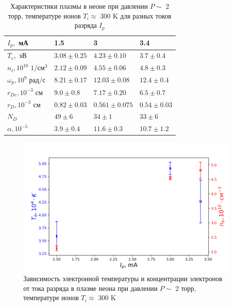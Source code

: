 \documentclass[a4paper,12pt]{article} %
\begin{document}
\begin{table}[h!]
\caption{Характеристики плазмы в неоне при давлении $P \sim$ 2 торр, температуре ионов $T_i \approx $ 300 K для разных токов разряда $I_p$}
\label{data}
\begin{tabular}{|l|l|l|l|}
\hline
$I_p,$ мА                & 1.5               & 3                 & 3.4               \\ \hline
$T_e,$ эВ                & $ 3.08 \pm 0.25 $   & $ 4.23 \pm 0.10 $   & $ 3.7 \pm 0.4 $   \\ \hline
$n_i, 10^{10}$ $ 1/см^3$    & $ 2.12 \pm 0.09 $   & $ 4.55 \pm 0.06 $   & $ 4.8 \pm 0.3 $   \\ \hline
$\omega_p, 10^{9}$ $ рад/с$ & $ 8.21 \pm 0.17 $   & $ 12.03 \pm 0.08 $  & $ 12.4 \pm 0.4 $  \\ \hline
$r_{De}, 10^{-3} $ $см$     & $ 9.0 \pm 0.8 $   & $ 7.17 \pm 0.20 $   & $ 6.5 \pm 0.7 $   \\ \hline
$r_{D}, 10^{-3} $ $см$      & $ 0.82 \pm 0.03 $ & $ 0.561 \pm 0.075 $ & $ 0.54 \pm 0.03 $ \\ \hline
$N_{D}$                  & $ 49 \pm 6 $      & $ 34 \pm 1 $      & $ 33 \pm 6 $      \\ \hline
$\alpha, 10^{-5}$        & $ 3.9 \pm 0.4 $   & $ 11.6 \pm 0.3 $  & $ 10.7 \pm 1.2 $  \\ \hline
\end{tabular}
\end{table}


\begin{figure}[h!]
\begin{center}
\includegraphics[width=\textwidth]{T,n(I_p)}
\caption{Зависимость электронной температуры и концентрации электронов от тока разряда в плазме неона при давлении $P \sim$ 2 торр, температуре ионов $T_i \approx $ 300 K} \label{от_тока_разряда}
\end{center}
\end{figure}
\end{document}
